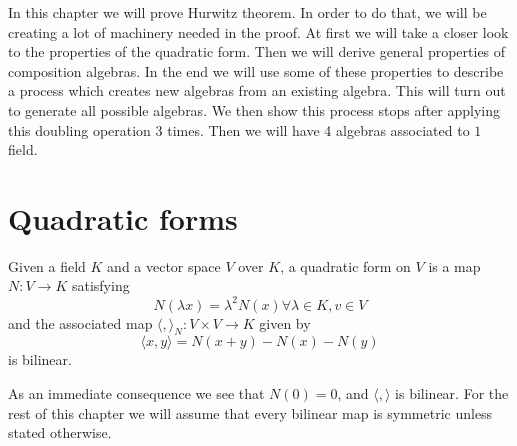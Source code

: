 \documentclass[../Thesis.tex]{subfiles}
\begin{document}
In this chapter we will prove Hurwitz theorem. In order to do that, we will be creating a lot of machinery needed in the proof. At first we will take a closer look to the properties of the quadratic form. Then we will derive general properties of composition algebras. In the end we will use some of these properties to describe a process which creates new algebras from an existing algebra. This will turn out to generate all possible algebras. We then show this process stops after applying this doubling operation 3 times. Then we will have 4 algebras associated to $1$ field.
\section{Quadratic forms}
\begin{mydef}
Given a field $K$ and a vector space $V$ over $K$, a quadratic form on $V$ is a map $N : V \rightarrow K$ satisfying
\begin{equation}
N(\lambda x) = \lambda^2 N(x) \forall \lambda \in K, v \in V
\end{equation}
and the associated map $\langle , \rangle_N : V \times V \rightarrow K$ given by
\begin{equation}
\langle x, y \rangle = N(x + y) - N(x) - N(y)
\end{equation}
is bilinear.
\end{mydef}
As an immediate consequence we see that $N(0) = 0$, and $\langle , \rangle$ is bilinear. For the rest of this chapter we will assume that every bilinear map is symmetric unless stated otherwise.
\end{document}

